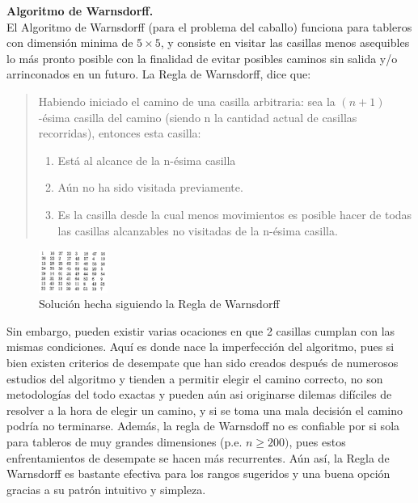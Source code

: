 \documentclass[journal, 10pt]{IEEEtran}
\begin{document}
\textbf{Algoritmo de Warnsdorff.}\\
El Algoritmo de Warnsdorff (para el problema del caballo) funciona para tableros con dimensión minima de $5\times 5$, y consiste en visitar las casillas menos asequibles lo más pronto posible con la finalidad de evitar posibles caminos sin salida y/o arrinconados en un futuro. La Regla de Warnsdorff\cite{Squirrel:1996}, dice que:
\begin{quote}
	Habiendo iniciado el camino de una casilla arbitraria: sea la $(n+1)$-ésima casilla del camino (siendo n la cantidad actual de casillas recorridas), entonces esta casilla:
	\begin{enumerate}
		\item Está al alcance de la n-ésima casilla
		\item Aún no ha sido visitada previamente.
		\item Es la casilla desde la cual menos movimientos es posible hacer de todas las casillas alcanzables no visitadas de la n-ésima casilla.
\end{enumerate}
\end{quote}

\begin{figure}[h]
\centering
\includegraphics[width=0.2\textwidth]{figures/warnsdorff.png}
\caption{Soluci\'on hecha siguiendo la Regla de Warnsdorff}
\label{fig:warnsdorff}
\end{figure}
Sin embargo, pueden existir varias ocaciones en que 2 casillas cumplan con las mismas condiciones. Aquí es donde nace la imperfección del algoritmo, pues si bien existen criterios de desempate que han sido creados después de numerosos estudios del algoritmo y tienden a permitir elegir el camino correcto, no son metodologías del todo exactas y pueden aún asi originarse dilemas difíciles de resolver a la hora de elegir un camino, y si se toma una mala decisión el camino podría no terminarse. Además, la regla de Warnsdoff no es confiable por si sola para tableros de muy grandes dimensiones (p.e. $n \geq 200)$, pues estos enfrentamientos de desempate se hacen más recurrentes. Aún así, la Regla de Warnsdorff es bastante efectiva para los rangos sugeridos y una buena opción gracias a su patrón intuitivo y simpleza.   
\end{document}
